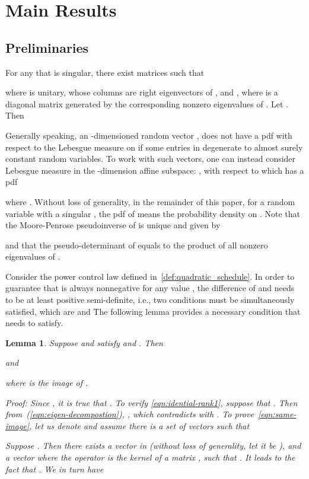 \documentclass[twocolumn]{autart}    \usepackage{cite}
\newtheorem{lemma}[theorem]{Lemma}
\begin{document}
{{\section{Main Results} \label{section:analysis}


\subsection{Preliminaries}\label{subsec:preliminaries}


For any  that is singular,
there exist
matrices 
such that

where  is unitary, whose columns
are right eigenvectors of ,
and , where 
is a diagonal matrix generated by the
corresponding nonzero eigenvalues
of . Let . Then 

Generally speaking, an -dimensioned random vector
,
does not have a pdf
with respect to the Lebesgue measure
on 
if some entries in  degenerate
to almost surely constant random variables.
To work with such vectors, one can instead consider Lebesgue measure in the -dimension affine subspace: , with respect to which
 has a pdf

where .
Without loss of generality, in the remainder of this paper,
for a random variable
 with a singular , the pdf of  means
the probability density on .
Note that the Moore-Penrose
pseudoinverse of  is unique and given
by

and that the
pseudo-determinant of  equals to the
product of all nonzero eigenvalues of .


Consider the power control law  defined in~\eqref{def:quadratic_schedule}.
In order to guarantee that  is always nonnegative for any value , the difference of
 and  needs to
be at least positive semi-definite, i.e.,
two conditions must be simultaneously satisfied, which
are   and  The following lemma
provides a necessary condition that  needs to satisfy.
\begin{lemma}\label{lemma:sigma-psi-property}
Suppose  and  satisfy  and . Then

and

where  is the image of .
\begin{pf*}{Proof:}
Since , it is true that
.
To verify \eqref{eqn:idential-rank1}, suppose that .
Then from~(\ref{eqn:eigen-decompostion}), ,
which contradicts with .
To prove~\eqref{eqn:same-image}, let us
denote  and  assume there is a set of vectors 
such that

Suppose . Then
there exists a vector in
 (without
loss of generality, let it be ),
and a vector 
where the operator  is the kernel of a matrix , such that .
It leads to the fact that
.
We in turn have


\end{pf*}
\end{lemma}}}
\end{document}
